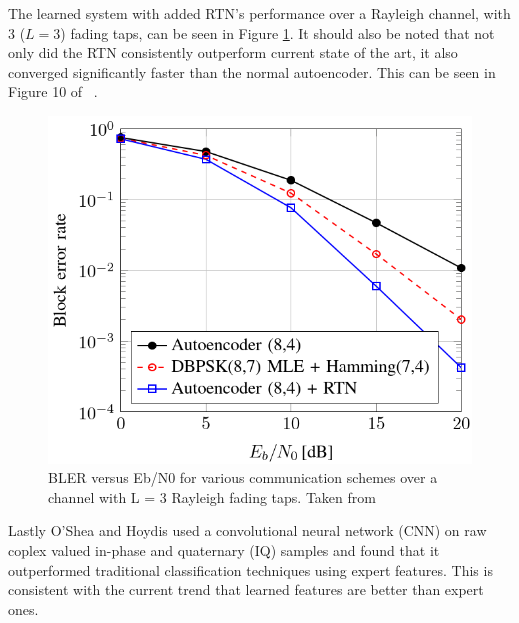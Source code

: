 \documentclass[12pt,onecolumn,letterpaper]{article}
\newcommand\genfigsize{0.5}
\begin{document}
The learned system with added RTN's performance over a Rayleigh channel, with 3 ($L = 3$) fading taps, can be seen in Figure \ref{fig:oSheaRtnRayleigh}. It should also be noted that not only did the RTN consistently outperform current state of the art, it also converged significantly faster than the normal autoencoder. This can be seen in Figure 10 of ~\cite{oShea}.

\begin{figure}[t]
   \centering
   \includegraphics[width=\genfigsize\linewidth]{figures/oShea_autoencoder_RTN_rayleigh_comp.PNG}
   \caption{BLER versus Eb/N0 for various communication schemes over a channel with L = 3 Rayleigh fading taps. Taken from~\cite{oShea}}
\label{fig:oSheaRtnRayleigh}
\end{figure}

Lastly O'Shea and Hoydis used a convolutional neural network (CNN) on raw coplex valued in-phase and quaternary (IQ) samples and found that it outperformed traditional classification techniques using expert features. This is consistent with the current trend that learned features are better than expert ones. 
\end{document}
